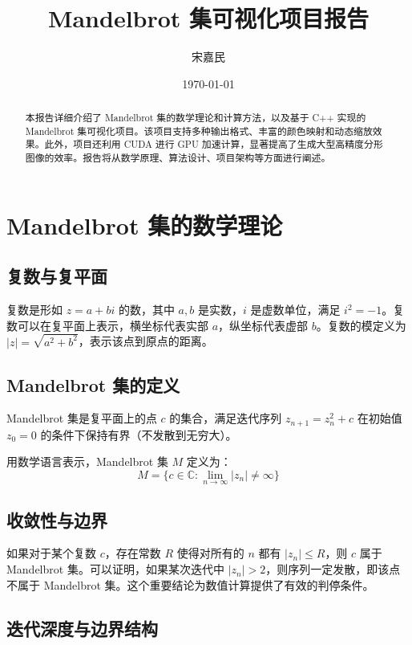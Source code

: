 \documentclass{article}
\title{Mandelbrot 集可视化项目报告}
\author{宋嘉民}
\date{\today}
\begin{document}
\maketitle

\begin{abstract}
本报告详细介绍了 Mandelbrot 集的数学理论和计算方法，以及基于 C++ 实现的 Mandelbrot 集可视化项目。该项目支持多种输出格式、丰富的颜色映射和动态缩放效果。此外，项目还利用 CUDA 进行 GPU 加速计算，显著提高了生成大型高精度分形图像的效率。报告将从数学原理、算法设计、项目架构等方面进行阐述。
\end{abstract}

\section{Mandelbrot 集的数学理论}

\subsection{复数与复平面}

复数是形如 $z = a + bi$ 的数，其中 $a, b$ 是实数，$i$ 是虚数单位，满足 $i^2 = -1$。复数可以在复平面上表示，横坐标代表实部 $a$，纵坐标代表虚部 $b$。复数的模定义为 $|z| = \sqrt{a^2 + b^2}$，表示该点到原点的距离。

\subsection{Mandelbrot 集的定义}

Mandelbrot 集是复平面上的点 $c$ 的集合，满足迭代序列 $z_{n+1} = z_n^2 + c$ 在初始值 $z_0 = 0$ 的条件下保持有界（不发散到无穷大）。

用数学语言表示，Mandelbrot 集 $M$ 定义为：
\begin{equation}
M = \{c \in \mathbb{C} : \lim_{n \to \infty} |z_n| \neq \infty \}
\end{equation}

\subsection{收敛性与边界}

如果对于某个复数 $c$，存在常数 $R$ 使得对所有的 $n$ 都有 $|z_n| \leq R$，则 $c$ 属于 Mandelbrot 集。可以证明，如果某次迭代中 $|z_n| > 2$，则序列一定发散，即该点不属于 Mandelbrot 集。这个重要结论为数值计算提供了有效的判停条件。

\subsection{迭代深度与边界结构}
\end{document}
